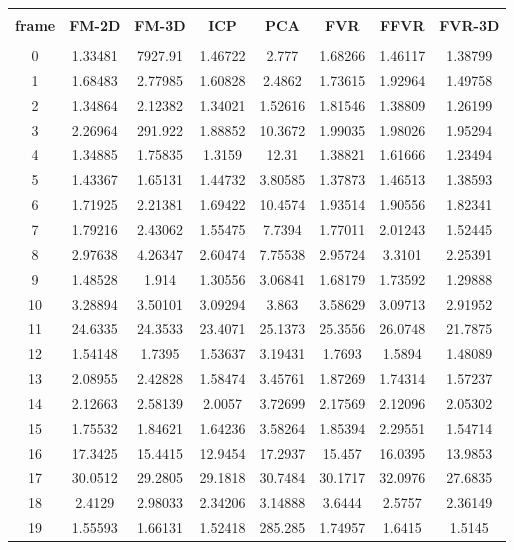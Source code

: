 \begin{center}
\begin{longtable}{cccccccc}
\hline \\
\textbf{frame} & \textbf{FM-2D} & \textbf{FM-3D} & \textbf{ICP} & \textbf{PCA} & \textbf{FVR} & \textbf{FFVR} & \textbf{FVR-3D} \\
\hline \\
0 & 1.33481 & 7927.91 & 1.46722 & 2.777 & 1.68266 & 1.46117 & 1.38799\\
1 & 1.68483 & 2.77985 & 1.60828 & 2.4862 & 1.73615 & 1.92964 & 1.49758\\
2 & 1.34864 & 2.12382 & 1.34021 & 1.52616 & 1.81546 & 1.38809 & 1.26199\\
3 & 2.26964 & 291.922 & 1.88852 & 10.3672 & 1.99035 & 1.98026 & 1.95294\\
4 & 1.34885 & 1.75835 & 1.3159 & 12.31 & 1.38821 & 1.61666 & 1.23494\\
5 & 1.43367 & 1.65131 & 1.44732 & 3.80585 & 1.37873 & 1.46513 & 1.38593\\
6 & 1.71925 & 2.21381 & 1.69422 & 10.4574 & 1.93514 & 1.90556 & 1.82341\\
7 & 1.79216 & 2.43062 & 1.55475 & 7.7394 & 1.77011 & 2.01243 & 1.52445\\
8 & 2.97638 & 4.26347 & 2.60474 & 7.75538 & 2.95724 & 3.3101 & 2.25391\\
9 & 1.48528 & 1.914 & 1.30556 & 3.06841 & 1.68179 & 1.73592 & 1.29888\\
10 & 3.28894 & 3.50101 & 3.09294 & 3.863 & 3.58629 & 3.09713 & 2.91952\\
11 & 24.6335 & 24.3533 & 23.4071 & 25.1373 & 25.3556 & 26.0748 & 21.7875\\
12 & 1.54148 & 1.7395 & 1.53637 & 3.19431 & 1.7693 & 1.5894 & 1.48089\\
13 & 2.08955 & 2.42828 & 1.58474 & 3.45761 & 1.87269 & 1.74314 & 1.57237\\
14 & 2.12663 & 2.58139 & 2.0057 & 3.72699 & 2.17569 & 2.12096 & 2.05302\\
15 & 1.75532 & 1.84621 & 1.64236 & 3.58264 & 1.85394 & 2.29551 & 1.54714\\
16 & 17.3425 & 15.4415 & 12.9454 & 17.2937 & 15.457 & 16.0395 & 13.9853\\
17 & 30.0512 & 29.2805 & 29.1818 & 30.7484 & 30.1717 & 32.0976 & 27.6835\\
18 & 2.4129 & 2.98033 & 2.34206 & 3.14888 & 3.6444 & 2.5757 & 2.36149\\
19 & 1.55593 & 1.66131 & 1.52418 & 285.285 & 1.74957 & 1.6415 & 1.5145\\

\end{longtable}
\end{center}
